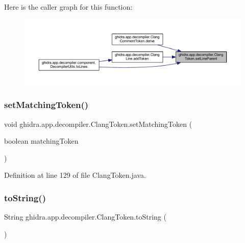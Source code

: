 Here is the caller graph for this function\+:
\nopagebreak
\begin{figure}[H]
\begin{center}
\leavevmode
\includegraphics[width=350pt]{classghidra_1_1app_1_1decompiler_1_1_clang_token_abc305091ad910f273f840684392739c2_icgraph}
\end{center}
\end{figure}
\mbox{\label{classghidra_1_1app_1_1decompiler_1_1_clang_token_a2d9efb4f3f0e30eee0bd27cfff526755}} 
\subsubsection{\texorpdfstring{setMatchingToken()}{setMatchingToken()}}
{\footnotesize\ttfamily void ghidra.\+app.\+decompiler.\+Clang\+Token.\+set\+Matching\+Token (\begin{DoxyParamCaption}\item[{boolean}]{matching\+Token }\end{DoxyParamCaption})\hspace{0.3cm}{\ttfamily [inline]}}



Definition at line 129 of file Clang\+Token.\+java.

\mbox{\label{classghidra_1_1app_1_1decompiler_1_1_clang_token_aafc7dbd3697a06c13f347947e1a2e9b5}} 
\subsubsection{\texorpdfstring{toString()}{toString()}}
{\footnotesize\ttfamily String ghidra.\+app.\+decompiler.\+Clang\+Token.\+to\+String (\begin{DoxyParamCaption}{ }\end{DoxyParamCaption})\hspace{0.3cm}{\ttfamily [inline]}}



